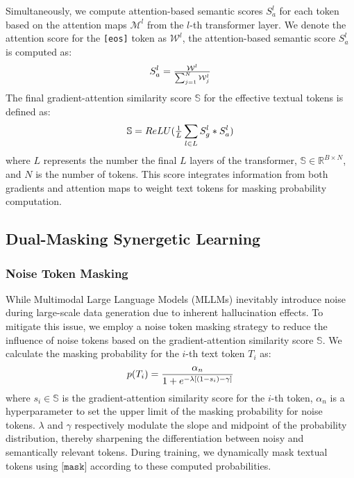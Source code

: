 Simultaneously, we compute attention-based semantic scores $S_a^l$ for each token based on the attention maps $\mathcal{M}^l$ from the $l$-th transformer layer. We denote the attention score for the \texttt{[eos]} token as $\mathcal{W}^l$, the attention-based semantic score $S_a^l$ is computed as:
\begin{equation}
\small
S_a^l=\tfrac{\mathcal{W}^l}{\sum_{j=1}^{N} \mathcal{W}^l_{j}}
\end{equation}
The final gradient-attention similarity score $\mathbb{S}$ for the effective textual tokens is defined as:
\begin{equation}
\small
\mathbb{S} = ReLU(\tfrac{1}{L} \sum_{l \in L} S_g^l * S_a^l)
\end{equation}
where $L$ represents the number the final $L$ layers of the transformer, $\mathbb{S} \in \mathbb{R}^{B \times N}$, and $N$ is the number of tokens. This score integrates information from both gradients and attention maps to weight text tokens for masking probability computation.

\subsection{Dual-Masking Synergetic Learning}
\label{section:learning}

\subsubsection{Noise Token Masking}
\label{section:noise}
While Multimodal Large Language Models (MLLMs) inevitably introduce noise during large-scale data generation due to inherent hallucination effects. To mitigate this issue, we employ a noise token masking strategy to reduce the influence of noise tokens based on the gradient-attention similarity score $\mathbb{S}$. We calculate the masking probability for the $i$-th text token $T_i$ as:
\begin{equation}
\small
p(T_i) = \frac{\alpha_n}{1 + e^{-\lambda[(1-s_i) - \gamma ]}} 
\label{equation:5}
\end{equation}
where $s_i \in \mathbb{S}$ is the gradient-attention similarity score for the $i$-th token, $\alpha_n$ is a hyperparameter to set the upper limit of the masking probability for noise tokens. $\lambda$ and $\gamma$ respectively modulate the slope and midpoint of the probability distribution, thereby sharpening the differentiation between noisy and semantically relevant tokens. During training, we dynamically mask textual tokens using $\texttt{[mask]}$ according to these computed probabilities.

